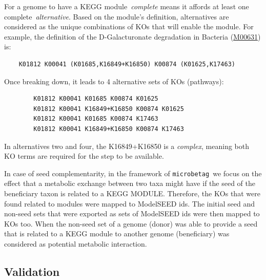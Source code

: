 \documentclass[sn-mathphys,Numbered]{sn-jnl}  %
\theoremstyle{thmstyleone}%
\theoremstyle{thmstyletwo}%
\theoremstyle{thmstylethree}%
\newcommand{\microbetag}{\texttt{microbetag }}
\begin{document}
\begin{appendices}
        For a genome to have a KEGG module~\textit{complete} means it affords at least one complete~\textit{alternative}.
        Based on the module's definition, alternatives are considered as the unique combinations of KOs that will enable the module.
        For example, the definition of the D-Galacturonate degradation in Bacteria (\href{https://www.genome.jp/dbget-bin/www_bget?M00631}{M00631}) is:
        \bigskip
        \begin{verbatim}    K01812 K00041 (K01685,K16849+K16850) K00874 (K01625,K17463)\end{verbatim}
        \bigskip
        
        Once breaking down, it leads to 4 alternative sets of KOs (pathways):

        \bigskip
        \begin{verbatim}
        K01812 K00041 K01685 K00874 K01625
        K01812 K00041 K16849+K16850 K00874 K01625
        K01812 K00041 K01685 K00874 K17463
        K01812 K00041 K16849+K16850 K00874 K17463
        \end{verbatim}
        \bigskip


        In alternatives two and four, the K16849+K16850 is a \textit{complex}, meaning both KO terms are required for the step to be available.


        In case of seed complementarity, in the framework of \microbetag we focus on the effect that a metabolic exchange between two taxa might have if the seed of the beneficiary taxon is related to a KEGG MODULE.
        Therefore, the KOs that were found related to modules were mapped to ModelSEED ids. 
        The initial seed and non-seed sets that were exported as sets of ModelSEED ids were then mapped to KOs too.
        When the non-seed set of a genome (donor) was able to provide a seed that is related to a KEGG module to another genome (beneficiary) was considered as potential metabolic interaction.




    \subsection*{Validation}
    \label{app:val}


\end{appendices}
\end{document}
